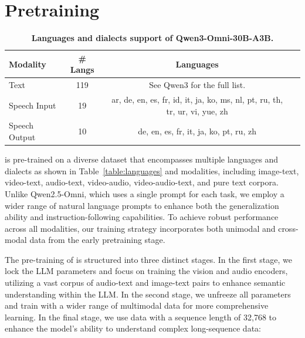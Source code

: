 \section{Pretraining}
\begin{table}[htbp]
\centering
\caption{\textbf{Languages and dialects support of Qwen3-Omni-30B-A3B.}}
\vspace{-1mm}
\begin{tabular}{lccc}
\toprule
Modality         & \# Langs      & Languages   
\\\midrule
Text  & 119         & See Qwen3 for the full list.        \\
Speech Input & 19    & ar, de, en, es, fr, id, it, ja, ko, ms, nl, pt, ru, th, tr, ur, vi, yue, zh           \\
Speech Output       & 10   & de, en, es, fr, it, ja, ko, pt, ru, zh          \\
\bottomrule
\end{tabular}
\end{table}
\label{table:languages}
\method is pre-trained on a diverse dataset that encompasses multiple languages and dialects as shown in Table~\ref{table:languages} and modalities, including image-text, video-text, audio-text, video-audio, video-audio-text, and pure text corpora. Unlike Qwen2.5-Omni, which uses a single prompt for each task, we employ a wider range of natural language prompts to enhance both the generalization ability and instruction-following capabilities. To achieve robust performance across all modalities, our training strategy incorporates both unimodal and cross-modal data from the early pretraining stage.

The pre-training of \method is structured into three distinct stages. In the first stage, we lock the LLM parameters and focus on training the vision and audio encoders, utilizing a vast corpus of audio-text and image-text pairs to enhance semantic understanding within the LLM. In the second stage, we unfreeze all parameters and train with a wider range of multimodal data for more comprehensive learning. In the final stage, we use data with a sequence length of 32,768 to enhance the model's ability to understand complex long-sequence data:



